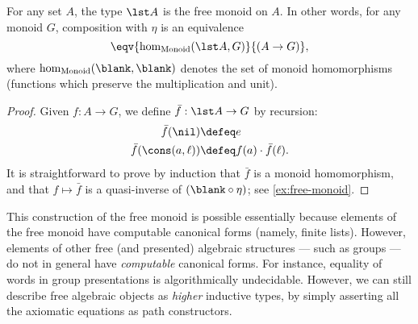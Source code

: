 \begin{lem}\label{thm:free-monoid}
  For any set $A$, the type $\lst A$ is the free monoid on $A$.
  In other words, for any monoid $G$, composition with $\eta$ is an equivalence
  \[ \eqv{\hom_{\mathrm{Monoid}}(\lst A,G)}{(A\to G)}, \]
  where $\hom_{\mathrm{Monoid}}(\blank,\blank)$ denotes the set of monoid homomorphisms (functions which preserve the multiplication and unit).
\end{lem}
\begin{proof}
  Given $f:A\to G$, we define $\bar{f}:\lst A \to G$ by recursion:
  \begin{align*}
    \bar{f}(\nil) &\defeq e\\
    \bar{f}(\cons(a,\ell)) &\defeq f(a) \cdot \bar{f}(\ell).
  \end{align*}
  It is straightforward to prove by induction that $\bar{f}$ is a monoid homomorphism, and that $f\mapsto \bar f$ is a quasi-inverse of $(\blank\circ \eta)$; see \cref{ex:free-monoid}.
\end{proof}

%

This construction of the free monoid is possible essentially because elements of the free monoid have computable canonical forms (namely, finite lists).
However, elements of other free (and presented) algebraic structures --- such as groups --- do not in general have \emph{computable} canonical forms.
For instance, equality of words in group presentations is algorithmically undecidable.
However, we can still describe free algebraic objects as \emph{higher} inductive types, by simply asserting all the axiomatic equations as path constructors.

